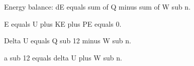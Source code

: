 Energy balance:  
dE equals sum of Q minus sum of W sub n.  

E equals U plus KE plus PE equals 0.  

Delta U equals Q sub 12 minus W sub n.  

a sub 12 equals delta U plus W sub n.